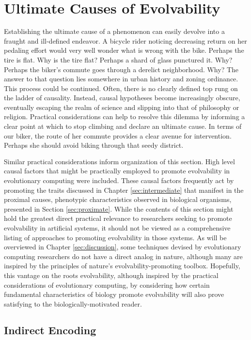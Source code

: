 \chapter{Ultimate Causes of Evolvability} \label{sec:ultimate}

Establishing the ultimate cause of a phenomenon can easily devolve into a fraught and ill-defined endeavor. A bicycle rider noticing decreasing return on her pedaling effort would very well wonder what is wrong with the bike. Perhaps the tire is flat. Why is the tire flat? Perhaps a shard of glass punctured it. Why? Perhaps the biker's commute goes through a derelict neighborhood. Why? The answer to that question lies somewhere in urban history and zoning ordinance. This process could be continued. Often, there is no clearly defined top rung on the ladder of causality. Instead, causal hypotheses become increasingly obscure, eventually escaping the realm of science and slipping into that of philosophy or religion. Practical considerations can help to resolve this dilemma by informing a clear point at which to stop climbing and declare an ultimate cause. In terms of our biker, the route of her commute provides a clear avenue for intervention. Perhaps she should avoid biking through that seedy district.

Similar practical considerations inform organization of this section.
High level causal factors that might be practically employed to promote evolvability in evolutionary computing were included.
These causal factors frequently act by promoting the traits discussed in Chapter \ref{sec:intermediate} that manifest in the proximal causes, phenotypic characteristics observed in biological organisms, presented in Section \ref{sec:proximate}. While the contents of this section might hold the greatest direct practical relevance to researchers seeking to promote evolvability in artificial systems, it should not be viewed as a comprehensive listing of approaches to promoting evolvability in those systems. As will be overviewed in Chapter \ref{sec:discussion}, some techniques devised by evolutionary computing researchers do not have a direct analog in nature, although many are inspired by the principles of nature's evolvability-promoting toolbox. Hopefully, this vantage on the roots evolvability, although inspired by the practical considerations of evolutionary computing, by considering how certain fundamental characteristics of biology promote evolvability will also prove satisfying to the biologically-motivated reader.

\section{Indirect Encoding} \label{sec:indirect-encoding}
